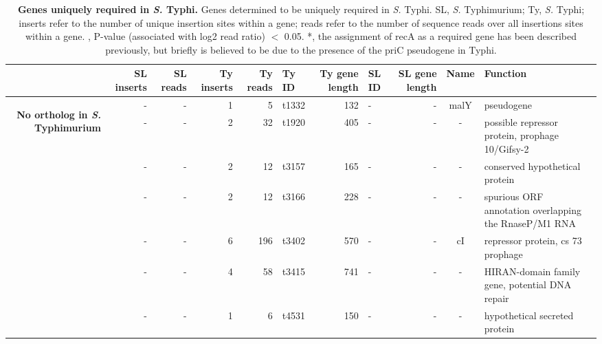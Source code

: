 %
\begingroup
\begin{landscape}
\begin{table}
   \tiny
   \noindent
    \caption[Genes uniquely required in {\it S.} Typhi]{\textbf{Genes uniquely required in {\it S.} Typhi.} Genes determined to be uniquely required in {\it S.} Typhi. SL, {\it S.} Typhimurium; Ty, {\it S.} Typhi; inserts refer to the number of unique insertion sites within a gene; reads refer to the number of sequence reads over all insertions sites within a gene.  \textdagger, P-value (associated with log2 read ratio) $<$ 0.05. *, the assignment of recA as a required gene has been described previously\parencite{Langridge2009a}, but briefly is believed to be due to the presence of the priC pseudogene in Typhi.}
        \begin{tabular}{ r
    				r
				r
				r
				r
				l
				r
				l
				r
				c
				p{1.8in}}
    \\
        \toprule
   & \textbf{SL inserts} & \textbf{SL reads} & \textbf{Ty inserts} & \textbf{Ty reads} & \textbf{Ty ID} & \textbf{Ty gene length} & \textbf{SL ID} & \textbf{SL gene length} & \textbf{Name} & \textbf{Function} \\
    \midrule
  \multirow{7}{*}{\begin{sideways}\parbox{1in}{\centering\textbf{No ortholog in {\it S.} Typhimurium}}\end{sideways}}& -     & -     & 1     & 5     & t1332 & 132   & -     & -     & malY  & pseudogene \\
  & -     & -     & 2     & 32    & t1920 & 405   & -     & -     & -     & possible repressor protein, prophage 10/Gifsy-2 \\
  & -     & -     & 2     & 12    & t3157 & 165   & -     & -     & -     & conserved hypothetical protein \\
  & -     & -     & 2     & 12    & t3166 & 228   & -     & -     & -     & spurious ORF annotation overlapping the RnaseP/M1 RNA \\
  & -     & -     & 6     & 196   & t3402 & 570   & -     & -     & cI    & repressor protein, cs 73 prophage \\
  & -     & -     & 4     & 58    & t3415 & 741   & -     & -     & -     & HIRAN-domain family gene, potential DNA repair \\
  & -     & -     & 1     & 6     & t4531 & 150   & -     & -     & -     & hypothetical secreted protein \\

\end{tabular}
\end{table}
\end{landscape}
